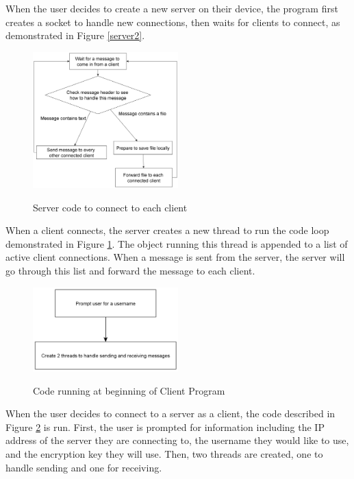 \documentclass{article}
\begin{document}
When the user decides to create a new server on their device, the program first creates a socket to handle new connections, then waits for clients to connect, as demonstrated in Figure \ref{server2}.

\begin{figure}[h]
\caption{Server code to connect to each client}
\centering
\includegraphics[width=0.5\textwidth]{media/serverFlowchart1.png}
\label{server1}
\end{figure}

When a client connects, the server creates a new thread to run the code loop demonstrated in Figure \ref{server1}. The object running this thread is appended to a list of active client connections. When a message is sent from the server, the server will go through this list and forward the message to each client.

\begin{figure}[h]
\caption{Code running at beginning of Client Program}
\centering
\includegraphics[width=0.5\textwidth]{media/clientFlowchart2.png}
\label{client2}
\end{figure}

When the user decides to connect to a server as a client, the code described in Figure \ref{client2} is run. First, the user is prompted for information including the IP address of the server they are connecting to, the username they would like to use, and the encryption key they will use. Then, two threads are created, one to handle sending and one for receiving.
\end{document}
